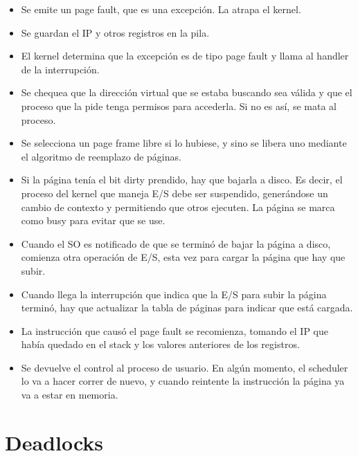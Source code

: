 \begin{itemize}
\item Se emite un page fault, que es una excepción. La atrapa el kernel.
\item Se guardan el IP y otros registros en la pila.
\item El kernel determina que la excepción es de tipo page fault y llama al handler de la interrupción.
\item Se chequea que la dirección virtual que se estaba buscando sea válida y que el proceso que la pide tenga permisos para accederla. Si no es así, se mata al proceso.
\item Se selecciona un page frame libre si lo hubiese, y sino se libera uno mediante el algoritmo de reemplazo de páginas.
\item Si la página tenía el bit dirty prendido, hay que bajarla a disco. Es decir, el proceso del kernel que maneja E/S debe ser suspendido, generándose un cambio de contexto y permitiendo que otros ejecuten. La página se marca como busy para evitar que se use.
\item Cuando el SO es notificado de que se terminó de bajar la página a disco, comienza otra operación de E/S, esta vez para cargar la página que hay que subir.
\item Cuando llega la interrupción que indica que la E/S para subir la página terminó, hay que actualizar la tabla de páginas para indicar que está cargada.
\item La instrucción que causó el page fault se recomienza, tomando el IP que había quedado en el stack y los valores anteriores de los registros.
\item Se devuelve el control al proceso de usuario. En algún momento, el scheduler lo va a hacer correr de nuevo, y cuando reintente la instrucción la página ya va a estar en memoria.
\end{itemize}


\section{Deadlocks}